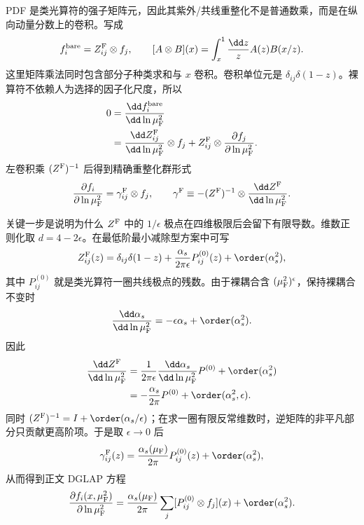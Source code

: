 \begin{derivation}[部分子分布的重整化与演化]
PDF 是类光算符的强子矩阵元，因此其紫外/共线重整化不是普通数乘，而是在纵向动量分数上的卷积。写成
\begin{equation*}
 f_i^{\rm bare}=Z^{\rm F}_{ij}\otimes f_j,
 \qquad
 [A\otimes B](x)=\int_x^1\frac{\dd z}{z}A(z)B(x/z).
\end{equation*}
这里矩阵乘法同时包含部分子种类求和与 $x$ 卷积。卷积单位元是
$\delta_{ij}\delta(1-z)$。裸算符不依赖人为选择的因子化尺度，所以
\begin{align*}
 0
 &=\frac{\dd f_i^{\rm bare}}{\dd\ln\mu_{\rm F}^2}\\
 &=\frac{\dd Z^{\rm F}_{ij}}{\dd\ln\mu_{\rm F}^2}\otimes f_j
 +Z^{\rm F}_{ij}\otimes
 \frac{\partial f_j}{\partial\ln\mu_{\rm F}^2}.
\end{align*}
左卷积乘 $(Z^{\rm F})^{-1}$ 后得到精确重整化群形式
\begin{equation*}
 \frac{\partial f_i}{\partial\ln\mu_{\rm F}^2}
 =\gamma^{\rm F}_{ij}\otimes f_j,
 \qquad
 \gamma^{\rm F}
 \equiv-(Z^{\rm F})^{-1}\otimes
 \frac{\dd Z^{\rm F}}{\dd\ln\mu_{\rm F}^2}.
\end{equation*}

关键一步是说明为什么 $Z^{\rm F}$ 中的 $1/\epsilon$ 极点在四维极限后会留下有限导数。维数正则化取 $d=4-2\epsilon$。在最低阶最小减除型方案中可写
\begin{equation*}
 Z^{\rm F}_{ij}(z)
 =\delta_{ij}\delta(1-z)
 +\frac{\alpha_s}{2\pi\epsilon}P_{ij}^{(0)}(z)
 +\order(\alpha_s^2),
\end{equation*}
其中 $P_{ij}^{(0)}$ 就是类光算符一圈共线极点的残数。由于裸耦合含 $(\mu_{\rm F}^2)^\epsilon$，保持裸耦合不变时
\begin{equation*}
 \frac{\dd\alpha_s}{\dd\ln\mu_{\rm F}^2}
 =-\epsilon\alpha_s+\order(\alpha_s^2).
\end{equation*}
因此
\begin{align*}
 \frac{\dd Z^{\rm F}}{\dd\ln\mu_{\rm F}^2}
 &=\frac{1}{2\pi\epsilon}
 \frac{\dd\alpha_s}{\dd\ln\mu_{\rm F}^2}P^{(0)}
 +\order(\alpha_s^2)\\
 &=-\frac{\alpha_s}{2\pi}P^{(0)}
 +\order(\alpha_s^2,\epsilon).
\end{align*}
同时
$(Z^{\rm F})^{-1}=I+\order(\alpha_s/\epsilon)$；在求一圈有限反常维数时，逆矩阵的非平凡部分只贡献更高阶项。于是取 $\epsilon\to0$ 后
\begin{equation*}
 \gamma^{\rm F}_{ij}(z)
 =\frac{\alpha_s(\mu_{\rm F})}{2\pi}P_{ij}^{(0)}(z)
 +\order(\alpha_s^2),
\end{equation*}
从而得到正文 DGLAP 方程
\begin{equation*}
 \frac{\partial f_i(x,\mu_{\rm F}^2)}{\partial\ln\mu_{\rm F}^2}
 =\frac{\alpha_s(\mu_{\rm F})}{2\pi}
 \sum_j[P_{ij}^{(0)}\otimes f_j](x)
 +\order(\alpha_s^2).
\end{equation*}


\end{derivation}
